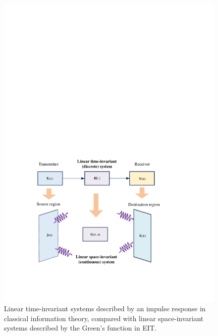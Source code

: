 \documentclass[journal,twocolumn]{IEEEtran}
\begin{document}
\begin{figure}
	\centering 
	\includegraphics[width=0.9\linewidth]{figures/LTI_LSI.pdf} 
	\caption{Linear time-invariant systems described by an impulse response in classical information theory, compared with linear space-invariant systems described by the Green's function in EIT.} 
	\label{fig:Shannon_Marzetta}
\end{figure}
\end{document}
